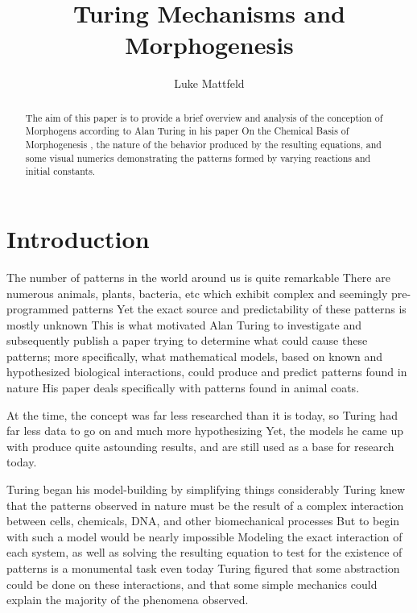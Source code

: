 \documentclass[12pt,a4paper]{amsart}
\numberwithin{equation}{section}
\theoremstyle{plain}
\theoremstyle{definition}
\begin{document}
\title{Turing Mechanisms and Morphogenesis}
\author{Luke Mattfeld}
\address{Eastern Washington University \\ Department of Mathematics} 

\begin{abstract}
  The aim of this paper is to provide a brief overview and analysis of the conception of Morphogens according to Alan Turing in his paper
  On the Chemical Basis of Morphogenesis \cite{turing}, the nature of the behavior produced by the resulting equations,
  and some visual numerics demonstrating the patterns formed by varying reactions and initial constants.
\end{abstract}

\maketitle

\section{Introduction}

  The number of patterns in the world around us is quite remarkable
  There are numerous animals, plants, bacteria, etc
  which exhibit complex and seemingly pre-programmed patterns
  Yet the exact source and predictability of these patterns is mostly unknown
  This is what motivated Alan Turing to investigate and subsequently publish a paper \cite{turing} trying to determine what could cause these patterns; more specifically, what mathematical models, based on known and hypothesized biological interactions, could produce and predict patterns found in nature
  His paper deals specifically with patterns found in animal coats.

  At the time, the concept was far less researched than it is today, so Turing had far less data to go on and much more hypothesizing
  Yet, the models he came up with produce quite astounding results, and are still used as a base for research today.

  Turing began his model-building by simplifying things considerably
  Turing knew that the patterns observed in nature must be the result of a complex interaction between cells, chemicals, DNA, and other biomechanical processes
  But to begin with such a model would be nearly impossible
  Modeling the exact interaction of each system, as well as solving the resulting equation to test for the existence of patterns is a monumental task even today
  Turing figured that some abstraction could be done on these interactions, and that some simple mechanics could explain the majority of the phenomena observed.
\end{document}
